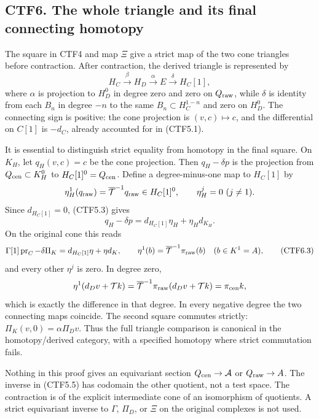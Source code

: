 \subsection{CTF6. The whole triangle and its final connecting
homotopy}\label{ctf6.-the-whole-triangle-and-its-final-connecting-homotopy}

The square in CTF4 and map \(\Xi\) give a strict map of the two cone
triangles before contraction. After contraction, the derived triangle is
represented by \[
H_C\xrightarrow{\beta}H_D
\xrightarrow{\alpha}E\xrightarrow{\delta}H_C[1],
\tag{CTF6.1}
\] where \(\alpha\) is projection to \(H_D^0\) in degree zero and zero
on \(Q_{\rm raw}\), while \(\delta\) is identity from each \(B_n\) in
degree \(-n\) to the same \(B_n\subset H_C^{1-n}\) and zero on
\(H_D^0\). The connecting sign is positive: the cone projection is
\((v,c)\mapsto c\), and the differential on \(C[1]\) is \(-d_C\),
already accounted for in (CTF5.1).

It is essential to distinguish strict equality from homotopy in the
final square. On \(K_H\), let \(q_H(v,c)=c\) be the cone projection.
Then \(q_H-\delta p\) is the projection from
\(Q_{\rm cen}\subset K_H^0\) to \(H_C[1]^0=Q_{\rm cen}\). Define a
degree-minus-one map to \(H_C[1]\) by \[
\eta_H^1(q_{\rm raw})=\overline{\mathcal T}^{-1}q_{\rm raw}
\in H_C[1]^0,\qquad \eta_H^j=0\ (j\ne1).
\] Since \(d_{H_C[1]}=0\), (CTF5.3) gives \[
q_H-\delta p=d_{H_C[1]}\eta_H+\eta_Hd_{K_H}.
\tag{CTF6.2}
\] On the original cone this reads \[
\Gamma[1]\operatorname{pr}_C-\delta\Pi_K
=d_{H_C[1]}\eta+\eta d_K,\qquad
\eta^1(b)=\overline{\mathcal T}^{-1}\pi_{\rm raw}(b)
\quad(b\in K^1=A),
\tag{CTF6.3}
\] and every other \(\eta^j\) is zero. In degree zero, \[
\eta^1(d_Dv+\mathcal Tk)=
\overline{\mathcal T}^{-1}\pi_{\rm raw}(d_Dv+\mathcal Tk)
=\pi_{\rm cen}k,
\] which is exactly the difference in that degree. In every negative
degree the two connecting maps coincide. The second square commutes
strictly: \(\Pi_K(v,0)=\alpha\Pi_Dv\). Thus the full triangle comparison
is canonical in the homotopy/derived category, with a specified homotopy
where strict commutation fails.

Nothing in this proof gives an equivariant section
\(Q_{\rm cen}\to\mathcal A\) or \(Q_{\rm raw}\to A\). The inverse in
(CTF5.5) has codomain the other quotient, not a test space. The
contraction is of the explicit intermediate cone of an isomorphism of
quotients. A strict equivariant inverse to \(\Gamma\), \(\Pi_D\), or
\(\Xi\) on the original complexes is not used.

